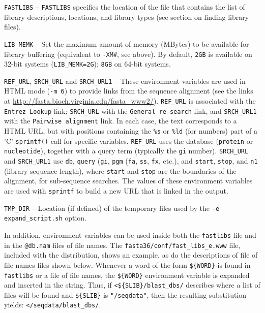\documentclass[11pt]{article}
\begin{document}
\texttt{FASTLIBS} -- \texttt{FASTLIBS}
specifies the location of the file that contains the list of library
descriptions, locations, and library types (see section on finding
library files).

\texttt{LIB\_MEMK} -- Set the maximum amount of memory (MBytes) to be
available for library buffering (equivalent to \texttt{-XM\#}, see
above).  By default, \texttt{2GB} is available on 32-bit systems
(\texttt{LIB\_MEMK=2G}); \texttt{8GB} on 64-bit systems.

\texttt{REF\_URL}, \texttt{SRCH\_URL} and \texttt{SRCH\_URL1} -- These
environment variables are used in HTML mode (\texttt{-m 6}) to provide
links from the sequence alignment (see the links at
\url{http://fasta.bioch.virginia.edu/fasta_www2/}). \texttt{REF\_URL}
is associated with the \texttt{Entrez Lookup} link; \texttt{SRCH\_URL}
with the \texttt{General re-search} link, and \texttt{SRCH\_URL1}
with the \texttt{Pairwise alignment} link.  In each case, the text
corresponds to a HTML URL, but with positions containing the
\texttt{\%s} or \texttt{\%ld} (for numbers) part of a 'C'
\texttt{sprintf()} call for specific variables. \texttt{REF\_URL} uses
the database (\texttt{protein} or \texttt{nucleotide}), together with
a query term (typically the \texttt{gi} number). \texttt{SRCH\_URL}
and \texttt{SRCH\_URL1} use \texttt{db}, \texttt{query} (\texttt{gi},
\texttt{pgm} (\texttt{fa}, \texttt{ss}, \texttt{fx}, etc.), and
\texttt{start}, \texttt{stop}, and \texttt{n1} (library sequence
length), where \texttt{start} and \texttt{stop} are the boundaries of
the alignment, for sub-sequence searches.  The values of these
environment variables are used with \texttt{sprintf} to build a new
URL that is linked in the output.

\texttt{TMP\_DIR} -- Location (if defined) of the temporary files used
by the \texttt{-e expand\_script.sh} option.

In addition, environment variables can be used inside both the
\texttt{fastlibs} file and in the \texttt{@db.nam} files of file
names. The \texttt{fasta36/conf/fast\_libs\_e.www} file, included with
the distribution, shows an example, as do the descriptions of file of
file names files shown below. Whenever a word of the form
\texttt{\$\{WORD\}} is found in \texttt{fastlibs} or a file of file
names, the \texttt{\$\{WORD\}} environment variable is expanded and
inserted in the string.  Thus, if \texttt{<\$\{SLIB\}/blast\_dbs/}
describes where a list of files will be found and \texttt{\$\{SLIB\}}
is \texttt{"/seqdata"}, then the resulting substitution yields:
\texttt{</seqdata/blast\_dbs/}.
\end{document}
